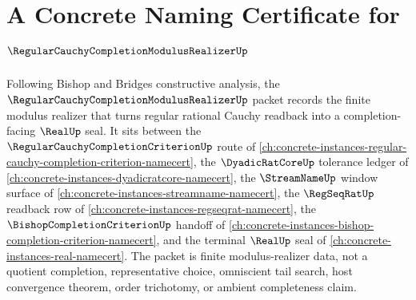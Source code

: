 \chapter{A Concrete Naming Certificate for $\RegularCauchyCompletionModulusRealizerUp$}
\label{ch:concrete-instances-regular-cauchy-completion-modulus-realizer-namecert}

Following Bishop and Bridges constructive analysis, the $\RegularCauchyCompletionModulusRealizerUp$ packet records the finite modulus realizer that turns regular rational Cauchy readback into a completion-facing $\RealUp$ seal. It sits between the $\RegularCauchyCompletionCriterionUp$ route of \autoref{ch:concrete-instances-regular-cauchy-completion-criterion-namecert}, the $\DyadicRatCoreUp$ tolerance ledger of \autoref{ch:concrete-instances-dyadicratcore-namecert}, the $\StreamNameUp$ window surface of \autoref{ch:concrete-instances-streamname-namecert}, the $\RegSeqRatUp$ readback row of \autoref{ch:concrete-instances-regseqrat-namecert}, the $\BishopCompletionCriterionUp$ handoff of \autoref{ch:concrete-instances-bishop-completion-criterion-namecert}, and the terminal $\RealUp$ seal of \autoref{ch:concrete-instances-real-namecert}. The packet is finite modulus-realizer data, not a quotient completion, representative choice, omniscient tail search, host convergence theorem, order trichotomy, or ambient completeness claim.

